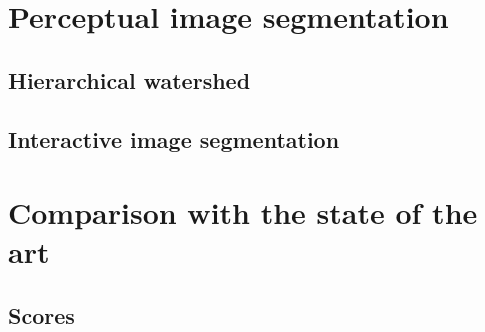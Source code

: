 \section{Perceptual image segmentation}
\subsection{Hierarchical watershed}
\subsection{Interactive image segmentation}



\section{Comparison with the state of the art}
\subsection{Scores}

